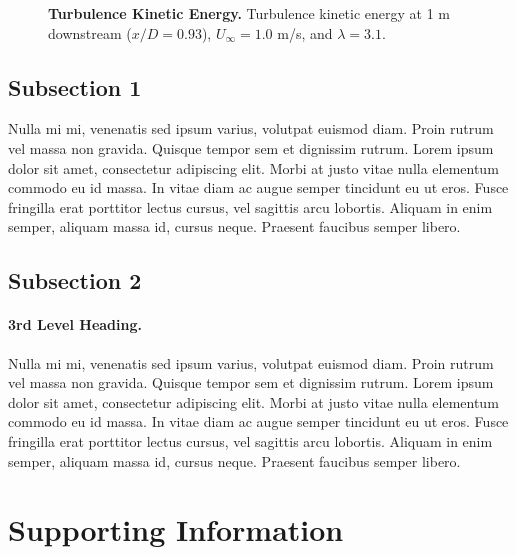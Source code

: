 \documentclass[10pt,letterpaper]{article}
\begin{document}
\begin{figure}[h]
\caption{{\bf Turbulence Kinetic Energy.}
Turbulence kinetic energy at 1 m downstream ($x/D=0.93$), $U_\infty=1.0$ m/s, and
$\lambda=3.1$.}
\label{kcont}
\end{figure}


\subsection*{Subsection 1}
Nulla mi mi, venenatis sed ipsum varius, volutpat euismod diam. Proin rutrum vel
massa non gravida. Quisque tempor sem et dignissim rutrum. Lorem ipsum dolor sit
amet, consectetur adipiscing elit. Morbi at justo vitae nulla elementum commodo
eu id massa. In vitae diam ac augue semper tincidunt eu ut eros. Fusce fringilla
erat porttitor lectus cursus, vel sagittis arcu lobortis. Aliquam in enim
semper, aliquam massa id, cursus neque. Praesent faucibus semper libero.

\subsection*{Subsection 2}
\paragraph{3rd Level Heading.} Nulla mi mi, venenatis sed ipsum varius, volutpat
euismod diam. Proin rutrum vel massa non gravida. Quisque tempor sem et
dignissim rutrum. Lorem ipsum dolor sit amet, consectetur adipiscing elit. Morbi
at justo vitae nulla elementum commodo eu id massa. In vitae diam ac augue
semper tincidunt eu ut eros. Fusce fringilla erat porttitor lectus cursus, vel
sagittis arcu lobortis. Aliquam in enim semper, aliquam massa id, cursus neque.
Praesent faucibus semper libero.


\section*{Supporting Information}

\end{document}
